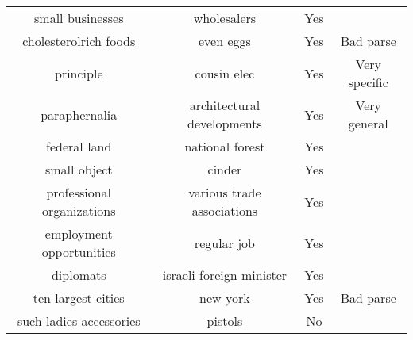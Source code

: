\documentclass[11pt]{article}
\begin{document}
\begin{tabular}{c c c c}
small businesses & wholesalers & Yes \\
cholesterolrich foods & even eggs &  Yes & Bad parse\\
principle & cousin elec & Yes & Very specific\\
paraphernalia & architectural developments & Yes & Very general \\
federal land & national forest & Yes \\
small object & cinder & Yes\\
professional organizations & various trade associations & Yes  \\
employment opportunities & regular job & Yes\\
diplomats & israeli foreign minister & Yes\\
ten largest cities & new york & Yes & Bad parse\\
such ladies accessories & pistols & No\\
\end{tabular}\\ 
\end{document}
